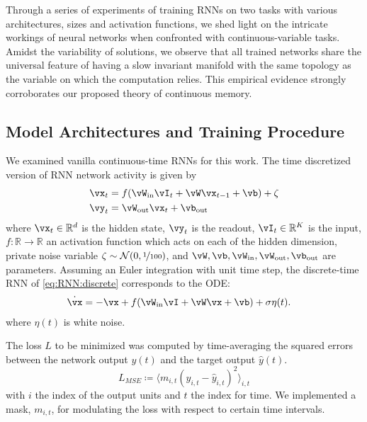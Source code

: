 \documentclass{article} %
\newcounter{ct}
\newcommand{\win}{\vW_{\text{in}}}
\newcommand{\wout}{\vW_{\text{out}}}
\newcommand{\bout}{\vb_{\text{out}}}
\newcommand{\reals}{\mathbb{R}}
\theoremstyle{definition}
\theoremstyle{remark}
\begin{document}
Through a series of experiments of training RNNs on two tasks with various architectures, sizes and activation functions, we shed light on the intricate workings of neural networks when confronted with continuous-variable tasks.
Amidst the variability of solutions, we observe that all trained networks share the universal feature of having a slow invariant manifold with the same topology as the variable on which the computation relies.
This empirical evidence strongly corroborates our proposed theory of continuous memory. 






\subsection{Model Architectures and Training Procedure}
We examined vanilla continuous-time RNNs for this work.
The time discretized version of RNN network activity is given by
\begin{equation}
  \begin{aligned}
	\vx_t &= f(\win \vI_t + \vW \vx_{t-1} + \vb) + \zeta \label{eq:RNN:discrete}\\
	\vy_t &= \wout \vx_t + \bout
  \end{aligned}
\end{equation}
where $\vx_t \in \reals^d$ is the hidden state, 
$\vy_t $ is the readout, 
$\vI_t \in \reals^K$ is the input,
$f\colon \reals \to \reals$ an activation function which acts on each of the hidden dimension, 
private noise variable $\zeta\sim\mathcal{N}(0,\nicefrac{1}{100})$, and %
$\vW, \vb, \win, \wout, \bout$ are parameters.
Assuming an Euler integration with unit time step, the discrete-time RNN of \eqref{eq:RNN:discrete} corresponds to the ODE:
\begin{align}
    \dot{\vx} &= -\vx + f(\win \vI + \vW \vx + \vb) + \sigma \eta(t). \label{eq:RNN:continuous}
\end{align}
where  $\eta (t)$ is white noise.

The loss $L$ to be minimized was computed by time-averaging the squared errors between the network output $y(t)$ and the target output $\hat y(t)$.
\begin{equation}\label{eq:loss}
L_{MSE} \coloneqq \langle m_{i,t}(y_{i,t}-\hat y_{i,t})^2\rangle_{i,t}
\end{equation}
with $i$  the index of the output units and $t$  the index for time.
 We implemented a mask, $m_{i,t}$, for modulating the loss with respect to certain time intervals.
\end{document}
